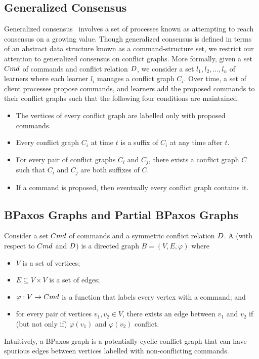 \subsection{Generalized Consensus}
Generalized consensus~\cite{lamport1998part, sutra2011fast} involves a set of
processes known as  attempting to reach consensus on a
growing value. Though generalized consensus is defined in terms of an abstract
data structure known as a command-structure set, we restrict our attention to
generalized consensus on conflict graphs. More formally, given a set $Cmd$ of
commands and conflict relation $D$, we consider a set $l_1, l_2,
\ldots, l_n$ of learners where each learner $l_i$ manages a conflict graph
$C_i$. Over time, a set of client processes propose commands, and learners add
the proposed commands to their conflict graphs such that the following four
conditions are maintained.
\begin{itemize}
  \item {}
    The vertices of every conflict graph are labelled only with proposed
    commands.
  \item {}
    Every conflict graph $C_i$ at time $t$ is a suffix of $C_i$ at any time after
    $t$.
  \item {}
    For every pair of conflict graphs $C_i$ and $C_j$, there exists a conflict
    graph $C$ such that $C_i$ and $C_j$ are both suffixes of $C$.
  \item {}
    If a command is proposed, then eventually every conflict graph contains it.
\end{itemize}

\subsection{BPaxos Graphs and Partial BPaxos Graphs}
Consider a set $Cmd$ of commands and a symmetric conflict relation
$D$. A  (with respect to $Cmd$ and $D$)
is a directed graph $B = (V, E, \varphi)$ where
\begin{itemize}
  \item
    $V$ is a set of vertices;
  \item
    $E \subseteq V \times V$ is a set of edges;
  \item
    $\varphi: V \to Cmd$ is a function that labels every vertex with a
    command; and
  \item
    for every pair of vertices $v_1, v_2 \in V$, there exists an edge between
    $v_1$ and $v_2$ if (but not only if) $\varphi(v_1)$ and $\varphi(v_2)$
    conflict.
\end{itemize}
Intuitively, a BPaxos graph is a potentially cyclic conflict graph that can
have spurious edges between vertices labelled with non-conflicting commands.

